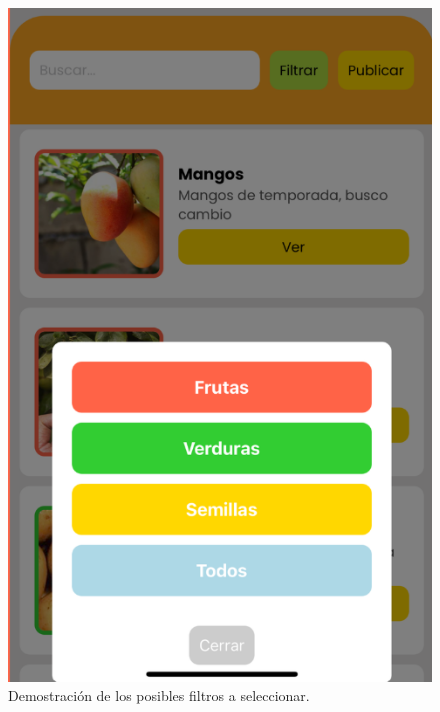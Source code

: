 \documentclass[11pt, a4paper, oneside]{book}
\begin{document}
\begin{itemize}
\begin{figure}[H]
    \centering
    \begin{minipage}{0.35\linewidth}
        \centering
        \includegraphics[width=\linewidth]{Pictures/BotonFiltro.png}
        \caption{Demostración de los posibles
filtros a seleccionar.}
    \end{minipage}
    \hfill
    \begin{minipage}{0.40\linewidth}
        \centering

\end{minipage}
\end{figure}
\end{itemize}
\end{document}

